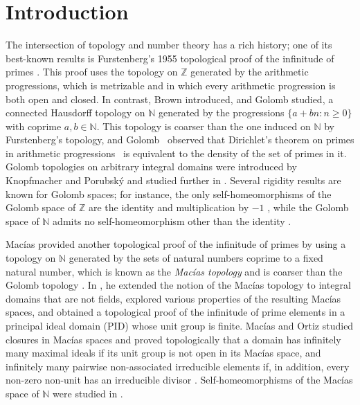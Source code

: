 \documentclass[12pt,reqno,a4paper]{amsart}
\newcommand{\Z}{\mathbb{Z}}
\newcommand{\N}{\mathbb{N}}
\theoremstyle{plain}
\theoremstyle{definition}
\begin{document}
\section{Introduction}\label{sec:intro}
The intersection of topology and number theory has a rich history; one of its best-known results is Furstenberg's 1955 topological proof of the infinitude of primes \cite{Furstenberg}. This proof uses the topology on $\Z$ generated by the arithmetic progressions, which is metrizable and in which every arithmetic progression is both open and closed. In contrast, Brown \cite{Brown} introduced, and Golomb \cite{Golomb} studied, a connected Hausdorff topology on $\N$ generated by the progressions $\{a+bn:n\geq 0\}$ with coprime $a,b\in\N$. This topology is coarser than the one induced on $\N$ by Furstenberg's topology, and Golomb~\cite[Theorem~6]{Golomb} observed that Dirichlet's theorem on primes in arithmetic progressions~\cite[Theorem~2.1]{diri} is equivalent to the density of the set of primes in it. Golomb topologies on arbitrary integral domains were introduced by Knopfmacher and Porubsk\'y \cite{KnopfmacherPorubsky} and studied further in \cite{Clark,CLLP}. Several rigidity results are known for Golomb spaces; for instance, the only self-homeomorphisms of the Golomb space of $\Z$ are the identity and multiplication by $-1$ \cite[Theorem~7.7]{Spirito}, while the Golomb space of $\N$ admits no self-homeomorphism other than the identity \cite[Theorem~1]{BST}.

Mac\'ias \cite{MaciasIntegers} provided another topological proof of the infinitude of primes by using a topology on $\N$ generated by the sets of natural numbers coprime to a fixed natural number, which is known as the \emph{Mac\'ias topology} and is coarser than the Golomb topology \cite[Remark~1]{MaciasIntegers}. In \cite{MaciasDomains}, he extended the notion of the Mac\'ias topology to integral domains that are not fields, explored various properties of the resulting Mac\'ias spaces, and obtained a topological proof of the infinitude of prime elements in a principal ideal domain (PID) whose unit group is finite. Mac\'ias and Ortiz \cite{MaciasOrtiz} studied closures in Mac\'ias spaces and proved topologically that a domain has infinitely many maximal ideals if its unit group is not open in its Mac\'ias space, and infinitely many pairwise non-associated irreducible elements if, in addition, every non-zero non-unit has an irreducible divisor \cite[Theorems~4.9 and~4.13]{MaciasOrtiz}. Self-homeomorphisms of the Mac\'ias space of $\N$ were studied in \cite{MaciasSelf}.
\end{document}
